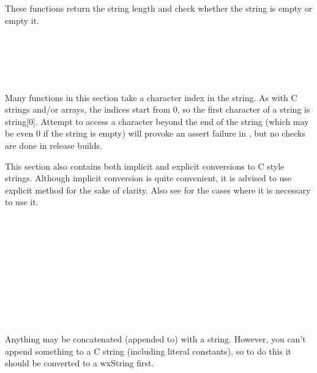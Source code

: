 \label{lengthfunctionsinwxstring}

These functions return the string length and check whether the string is empty
or empty it.

\\
\\
\\
\\


\label{characteraccessinwxstring}

Many functions in this section take a character index in the string. As with C
strings and/or arrays, the indices start from $0$, so the first character of a
string is string[$0$]. Attempt to access a character beyond the end of the
string (which may be even $0$ if the string is empty) will provoke an assert
failure in , but no checks are done in
release builds.

This section also contains both implicit and explicit conversions to C style
strings. Although implicit conversion is quite convenient, it is advised to use
explicit  method for the sake of clarity. Also
see  for the cases where it is necessary to
use it.

\\
\\
\\
\\
\\
\\
\\
\\
\\


\label{concatenationinwxstring}

Anything may be concatenated (appended to) with a string. However, you can't
append something to a C string (including literal constants), so to do this it
should be converted to a wxString first.

